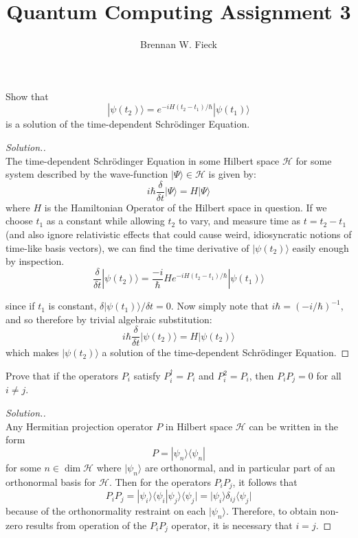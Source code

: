 \documentclass[12pt]{article}
\newenvironment{problem}[2][Problem]{\begin{trivlist}
\item[\hskip \labelsep {\bfseries #1}\hskip \labelsep {\bfseries #2.}]}{\end{trivlist}}
\begin{document}
 
 
\title{Quantum Computing Assignment 3}
\author{Brennan W. Fieck}
\maketitle

\begin{problem}{3.2.1}
Show that
$$|\psi(t_2)\rangle=e^{-iH(t_2-t_1)/\hbar}|\psi(t_1)\rangle$$
is a solution of the time-dependent Schr\"odinger Equation.
\end{problem}

\begin{proof}[Solution.]~\\
The time-dependent Schr\"odinger Equation in some Hilbert space $\mathcal{H}$ for
some system described by the wave-function $|\Psi\rangle\in\mathcal{H}$ is given by:
$$i\hbar\frac{\delta}{\delta t}|\Psi\rangle=H|\Psi\rangle$$
where $H$ is the Hamiltonian Operator of the Hilbert space in question. If we
choose $t_1$ as a constant while allowing $t_2$ to vary, and measure time as $t=t_2-t_1$ (and also ignore relativistic effects that could cause weird, idiosyncratic notions of time-like basis vectors), we can find the time derivative of $|\psi(t_2)\rangle$ easily enough by inspection.
$$\frac{\delta}{\delta t}|\psi(t_2)\rangle=\frac{-i}{\hbar}He^{-iH(t_2-t_1)/\hbar}|\psi(t_1)\rangle$$

since if $t_1$ is constant, $\delta|\psi(t_1)\rangle/\delta t=0$.
Now simply note that $i\hbar=(-i/\hbar)^{-1}$, and so therefore by trivial algebraic substitution:
$$i\hbar\frac{\delta}{\delta t}|\psi(t_2)\rangle=H|\psi(t_2)\rangle$$
which makes $|\psi(t_2)\rangle$ a solution of the time-dependent Schr\"odinger Equation.
\end{proof}

\begin{problem}{3.4.1(a)}
Prove that if the operators $P_i$ satisfy $P_i^\dagger=P_i$ and $P_i^2=P_i$,
then $P_iP_j=0$ for all $i\neq j$.
\end{problem}

\begin{proof}[Solution.]~\\
Any Hermitian projection operator $P$ in Hilbert space $\mathcal{H}$ can be
written in the form
$$P=|\psi_n\rangle\langle\psi_n|$$
for some $n\in\dim{\mathcal{H}}$ where $|\psi_n\rangle$ are orthonormal, and in
particular part of an orthonormal basis for $\mathcal{H}$. Then for the
operators $P_iP_j$, it follows that 
$$P_iP_j=|\psi_i\rangle\langle\psi_i|\psi_j\rangle\langle\psi_j|=|\psi_i\rangle\delta_{ij}\langle\psi_j|$$
because of the orthonormality restraint on each $|\psi_n\rangle$. Therefore, to
obtain non-zero results from operation of the $P_iP_j$ operator, it is necessary
that $i=j$.
\end{proof}
\end{document}
